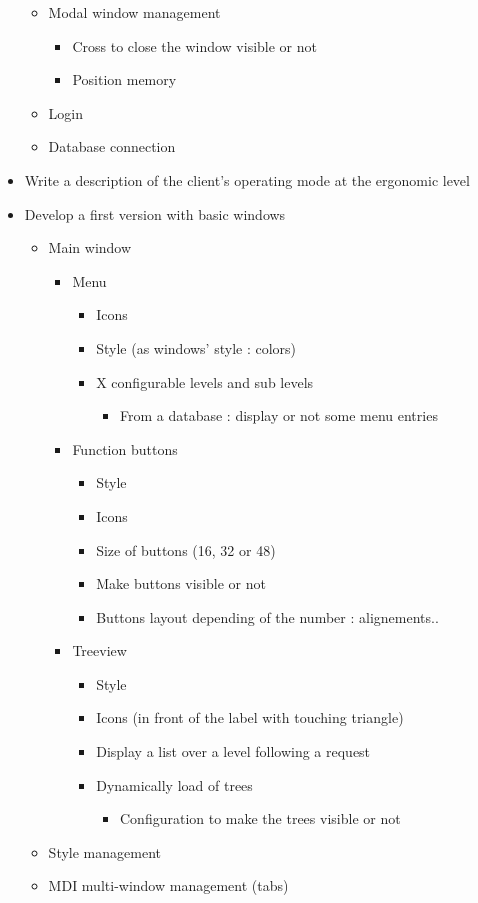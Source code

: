\documentclass[a4paper, 12pt, french]{article}
\newcommand{\bdot}{\item[\color{ssiYellow}\ding{108}]}
\newcommand{\bdotoutlined}{\item[\color{ssiYellow}\ding{109}]}
\newcommand{\bsquare}{\item[\color{ssiYellow}\ding{110}]}
\newcommand{\bsquareoutlined}{\item[\color{ssiYellow}\ding{111}]}
\newcommand{\bdiamond}{\item[\color{ssiYellow}\ding{117}]}
\begin{document}
\begin{itemize}
\begin{itemize}
\begin{itemize}
									\end{itemize}
								\bdotoutlined{Modal window management}
									\begin{itemize}
										\bsquare{Cross to close the window visible or not}
										\bsquare{Position memory}
									\end{itemize}
								\bdotoutlined{Login}
								\bdotoutlined{Database connection}
							\end{itemize}
						\bdot{Write a description of the client's operating mode at the ergonomic level}
						\bdot{Develop a first version with basic windows}
							\begin{itemize}
								\bdotoutlined{Main window}
									\begin{itemize}
										\bsquare{Menu}
											\begin{itemize}
												\bsquareoutlined{Icons}
												\bsquareoutlined{Style (as windows' style : colors)}
												\bsquareoutlined{X configurable levels and sub levels}
													\begin{itemize}
														\bdiamond{From a database : display or not some menu entries}
													\end{itemize}
											\end{itemize}
										\bsquare{Function buttons}
											\begin{itemize}
												\bsquareoutlined{Style}
												\bsquareoutlined{Icons}
												\bsquareoutlined{Size of buttons (16, 32 or 48)}
												\bsquareoutlined{Make buttons visible or not}
												\bsquareoutlined{Buttons layout depending of the number : alignements..}
											\end{itemize}
										\bsquare{Treeview}
											\begin{itemize}
												\bsquareoutlined{Style}
												\bsquareoutlined{Icons (in front of the label with touching triangle)}
												\bsquareoutlined{Display a list over a level following a request}
												\bsquareoutlined{Dynamically load of trees}
													\begin{itemize}
														\bdiamond{Configuration to make the trees visible or not}
													\end{itemize}
											\end{itemize}
									\end{itemize}
								\bdotoutlined{Style management}
								\bdotoutlined{MDI multi-window management (tabs)}
									\begin{itemize}

\end{itemize}
\end{itemize}
\end{itemize}
\end{document}
